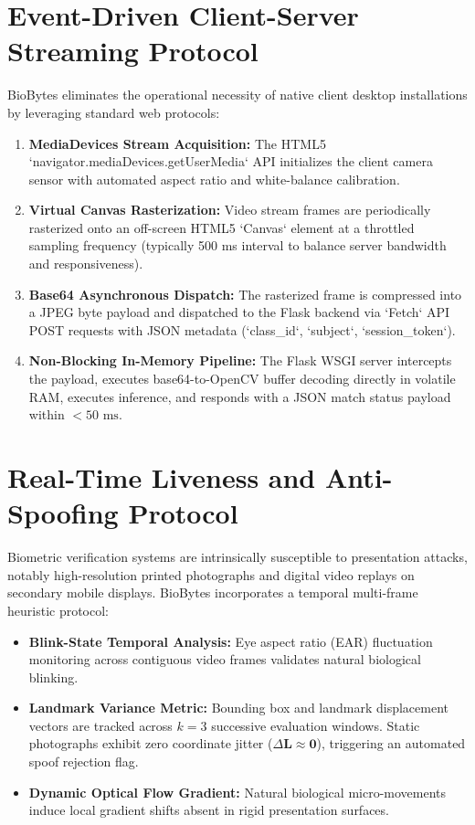\documentclass[12pt,a4paper,oneside]{report}
\begin{document}
\section{Event-Driven Client-Server Streaming Protocol}
BioBytes eliminates the operational necessity of native client desktop installations by leveraging standard web protocols:
\begin{enumerate}
    \item \textbf{MediaDevices Stream Acquisition:} The HTML5 `navigator.mediaDevices.getUserMedia` API initializes the client camera sensor with automated aspect ratio and white-balance calibration.
    \item \textbf{Virtual Canvas Rasterization:} Video stream frames are periodically rasterized onto an off-screen HTML5 `Canvas` element at a throttled sampling frequency (typically 500 ms interval to balance server bandwidth and responsiveness).
    \item \textbf{Base64 Asynchronous Dispatch:} The rasterized frame is compressed into a JPEG byte payload and dispatched to the Flask backend via `Fetch` API POST requests with JSON metadata (`class_id`, `subject`, `session_token`).
    \item \textbf{Non-Blocking In-Memory Pipeline:} The Flask WSGI server intercepts the payload, executes base64-to-OpenCV buffer decoding directly in volatile RAM, executes inference, and responds with a JSON match status payload within $< 50\text{ ms}$.
\end{enumerate}

\section{Real-Time Liveness and Anti-Spoofing Protocol}
Biometric verification systems are intrinsically susceptible to presentation attacks, notably high-resolution printed photographs and digital video replays on secondary mobile displays. BioBytes incorporates a temporal multi-frame heuristic protocol:
\begin{itemize}
    \item \textbf{Blink-State Temporal Analysis:} Eye aspect ratio (EAR) fluctuation monitoring across contiguous video frames validates natural biological blinking.
    \item \textbf{Landmark Variance Metric:} Bounding box and landmark displacement vectors are tracked across $k=3$ successive evaluation windows. Static photographs exhibit zero coordinate jitter ($\Delta \mathbf{L} \approx \mathbf{0}$), triggering an automated spoof rejection flag.
    \item \textbf{Dynamic Optical Flow Gradient:} Natural biological micro-movements induce local gradient shifts absent in rigid presentation surfaces.
\end{itemize}
\end{document}
